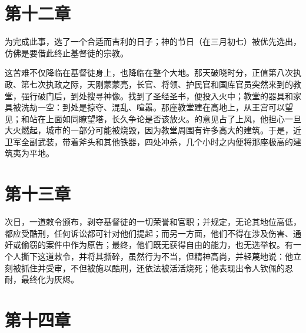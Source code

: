 
\section{第十二章}

为完成此事，选了一个合适而吉利的日子；神的节日（在三月初七）被优先选出，仿佛是要借此终止基督徒的宗教。\par

\par

这苦难不仅降临在基督徒身上，也降临在整个大地。那天破晓时分，正值第八次执政、第七次执政之际，天刚蒙蒙亮，长官、将领、护民官和国库官员突然来到的教堂，强行破门后，到处搜寻神像。找到了圣经圣书，便投入火中；教堂的器具和家具被洗劫一空：到处是掠夺、混乱、喧嚣。那座教堂建在高地上，从王宫可以望见；和站在上面如同瞭望塔，长久争论是否该放火。的意见占了上风，他担心一旦大火燃起，城市的一部分可能被烧毁，因为教堂周围有许多高大的建筑。于是，近卫军全副武装，带着斧头和其他铁器，四处冲杀，几个小时之内便将那座极高的建筑夷为平地。\par


\section{第十三章}

次日，一道敕令颁布，剥夺基督徒的一切荣誉和官职；并规定，无论其地位高低，都应受酷刑，任何诉讼都可针对他们提起；而另一方面，他们不得在涉及伤害、通奸或偷窃的案件中作为原告；最终，他们既无获得自由的能力，也无选举权。有一个人撕下这道敕令，并将其撕碎，虽然行为不当，但精神高尚，并轻蔑地说：他立刻被抓住并受审，不但被施以酷刑，还依法被活活烧死；他表现出令人钦佩的忍耐，最终化为灰烬。\par


\section{第十四章}

